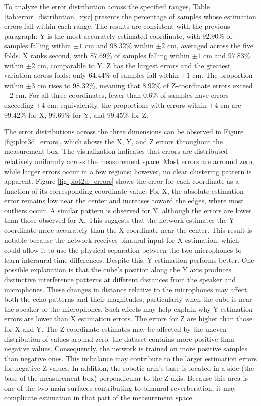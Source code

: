 To analyze the error distribution across the specified ranges, Table \ref{tab:error_distribution_xyz} presents the percentage of samples whose estimation errors fall within each range. The results are consistent with the previous paragraph: Y is the most accurately estimated coordinate, with $92.90\%$ of samples falling within $\pm 1\text{ cm}$ and $98.32\%$ within $\pm 2\text{ cm}$, averaged across the five folds. X ranks second, with $87.69\%$ of samples falling within $\pm 1\text{ cm}$ and $97.83\%$ within $\pm 2\text{ cm}$, comparable to Y. Z has the largest errors and the greatest variation across folds: only $64.44\%$ of samples fall within $\pm 1\text{ cm}$. The proportion within $\pm 3\text{ cm}$ rises to $98.32\%$, meaning that $8.92\%$ of Z-coordinate errors exceed $\pm 2\text{ cm}$. For all three coordinates, fewer than $0.6\%$ of samples have errors exceeding $\pm 4\text{ cm}$; equivalently, the proportions with errors within $\pm 4\text{ cm}$ are $99.42\%$ for X, $99.69\%$ for Y, and $99.45\%$ for Z.

The error distributions across the three dimensions can be observed in Figure \ref{fig:plot3d_errors}, which shows the X, Y, and Z errors throughout the measurement box. The visualization indicates that errors are distributed relatively uniformly across the measurement space. Most errors are arround zero, while larger errors occur in a few regions; however, no clear clustering pattern is apparent. Figure \ref{fig:plot2d_errors} shows the error for each coordinate as a function of its corresponding coordinate value. For X, the absolute estimation error remains low near the center and increases toward the edges, where most outliers occur. A similar pattern is observed for Y, although the errors are lower than those observed for X. This suggests that the network estimates the Y coordinate more accurately than the X coordinate near the center. This result is notable because the network receives binaural input for X estimation, which could allow it to use the physical separation between the two microphones to learn interaural time differences. Despite this, Y estimation performs better. One possible explanation is that the cube's position along the Y axis produces distinctive interference patterns at different distances from the speaker and microphones. These changes in distance relative to the microphones may affect both the echo patterns and their magnitudes, particularly when the cube is near the speaker or the microphones. Such effects may help explain why Y estimation errors are lower than X estimation errors. The errors for Z are higher than those for X and Y. The Z-coordinate estimates may be affected by the uneven distribution of values around zero: the dataset contains more positive than negative values. Consequently, the network is trained on more positive samples than negative ones. This imbalance may contribute to the larger estimation errors for negative Z values. In addition, the robotic arm's base is located in a side (the base of the measurement box) perpendicular to the Z axis. Because this area is one of the two main surfaces contributing to binaural reverberation, it may complicate estimation in that part of the measurement space.


